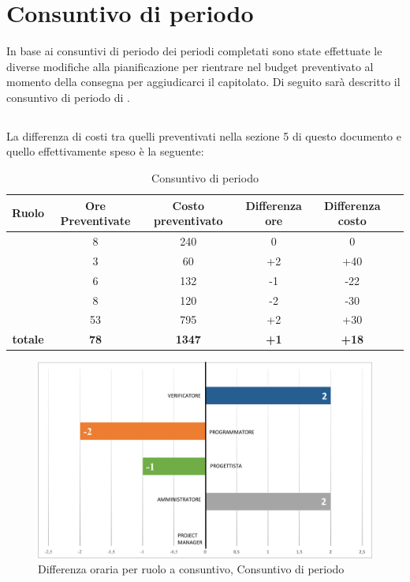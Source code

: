 \newpage
\section{Consuntivo di periodo}

In base ai consuntivi di periodo dei periodi completati sono state effettuate le diverse modifiche alla pianificazione per rientrare nel budget preventivato al momento della consegna per aggiudicarci il capitolato.
Di seguito sarà descritto il consuntivo di periodo di \VV.

\subsection{\VV}
La differenza di costi tra quelli preventivati nella sezione 5 di questo documento e quello effettivamente speso è la seguente:

\begin{table}[h]
	\begin{center}
		\begin{tabular}{|c|c|c|c|c|c|}
			\hline
			\textbf{Ruolo}	& \textbf{Ore Preventivate} & \textbf{Costo preventivato} &  \textbf{Differenza ore} & \textbf{Differenza costo} \\
			\hline
			\Pm &	8 & 240 & 0 & 0\\
			\hline
			\Am	&	3 & 60 & +2 & +40\\
			\hline
			\Prog	&	6 & 132 & -1 & -22\\
			\hline
			\Progr	&	8 & 120 & -2 & -30\\
			\hline
			\Ver	&	53 & 795 & +2 & +30\\
			\hline
			\textbf{totale}	&	\textbf{78} & \textbf{1347} & \textbf{+1} & \textbf{+18}\\
			\hline
		\end{tabular}
	\end{center}
	\caption{Consuntivo di periodo \VV}
\end{table}

\begin{figure}[H]
	\centering
	\includegraphics[scale=0.7]{Immagini/GraficiCONS/DIFFCONSP.png}
	\caption{Differenza oraria per ruolo a consuntivo, Consuntivo di periodo \VV}
\end{figure}

